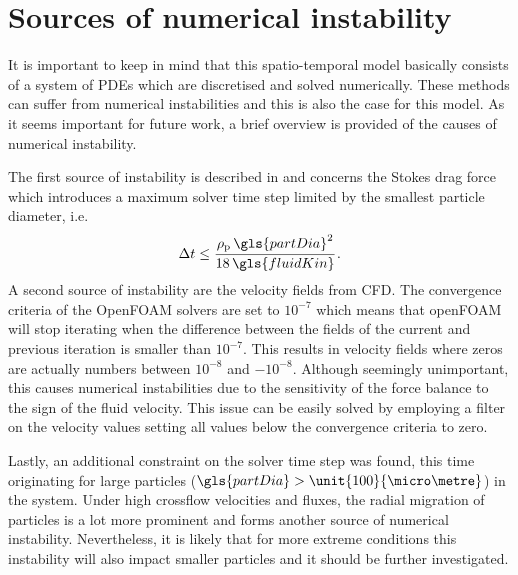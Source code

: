 % 

\section{Sources of numerical instability}
It is important to keep in mind that this spatio-temporal model basically consists of a system of \gls{PDE}s which are discretised and solved numerically. These methods can suffer from numerical instabilities and this is also the case for this model. As it seems important for future work, a brief overview is provided of the causes of numerical instability. \par
The first source of instability is described in \cite{Ghijs2014} and concerns the Stokes drag force which introduces a maximum solver time step limited by the smallest particle diameter, i.e.\
\begin{equation}
 \Delta t \leq \cfrac{\rho_\mathrm{p}\, \gls{partDia}^2}{18 \, \gls{fluidKin}} \, .
\end{equation}
A second source of instability are the velocity fields from \gls{CFD}. The convergence criteria of the OpenFOAM solvers are set to $10^{-7}$ which means that openFOAM will stop iterating when the difference between the fields of the current and previous iteration is smaller than $10^{-7}$. This results in velocity fields where zeros are actually numbers between $10^{-8}$ and $-10^{-8}$. Although seemingly unimportant, this causes numerical instabilities due to the sensitivity of the force balance to the sign of the fluid velocity. This issue can be easily solved by employing a filter on the velocity values setting all values below the convergence criteria to zero. \par
Lastly, an additional constraint on the solver time step was found, this time originating for large particles ($\gls{partDia} > \unit{100}{\micro\metre}$) in the system. Under high crossflow velocities and fluxes, the radial migration of particles is a lot more prominent and forms another source of numerical instability. Nevertheless, it is likely that for more extreme conditions this instability will also impact smaller particles and it should be further investigated.

